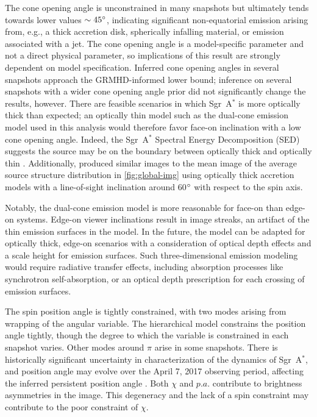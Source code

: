 \documentclass[linenumbers, twocolumn, tighten]{aastex701}
\def\sgra{Sgr~A$^*$\xspace}
\begin{document}
The cone opening angle is unconstrained in many snapshots but ultimately tends towards lower values $\sim 45\degree$, indicating significant non-equatorial emission arising from, e.g., a thick accretion disk, spherically infalling material, or emission associated with a jet.  The cone opening angle is a model-specific parameter and not a direct physical parameter, so implications of this result are strongly dependent on model specification. Inferred cone opening angles in several snapshots approach the GRMHD-informed lower bound; inference on several snapshots with a wider cone opening angle prior did not significantly change the results, however. There are feasible scenarios in which \sgra is more optically thick than expected; an optically thin model such as the dual-cone emission model used in this analysis would therefore favor face-on inclination with a low cone opening angle. Indeed, the \sgra Spectral Energy Decomposition (SED) suggests the source may be on the boundary between optically thick and optically thin \citep{Broderick_2016}. Additionally, \citealt{Broderick_2016} produced similar images to the mean image of the average source structure distribution in \autoref{fig:global-img} using optically thick accretion models with a line-of-sight inclination around 60$\degree$ with respect to the spin axis.

Notably, the dual-cone emission model is more reasonable for face-on than edge-on systems. Edge-on viewer inclinations result in image streaks, an artifact of the thin emission surfaces in the model. In the future, the model can be adapted for optically thick, edge-on scenarios with a consideration of optical depth effects and a scale height for emission surfaces. Such three-dimensional emission modeling would require radiative transfer effects, including absorption processes like synchrotron self-absorption, or an optical depth prescription for each crossing of emission surfaces.

The spin position angle is tightly constrained, with two modes arising from wrapping of the angular variable. The hierarchical model constrains the position angle tightly, though the degree to which the variable is constrained in each snapshot varies. Other modes around $\pi$ arise in some snapshots. There is historically significant uncertainty in characterization of the dynamics of \sgra, and position angle may evolve over the April 7, 2017 observing period, affecting the inferred persistent position angle . 
Both $\chi$ and $p.a.$ contribute to brightness asymmetries in the image. This degeneracy and the lack of a spin constraint may contribute to the poor constraint of $\chi$.
\end{document}

